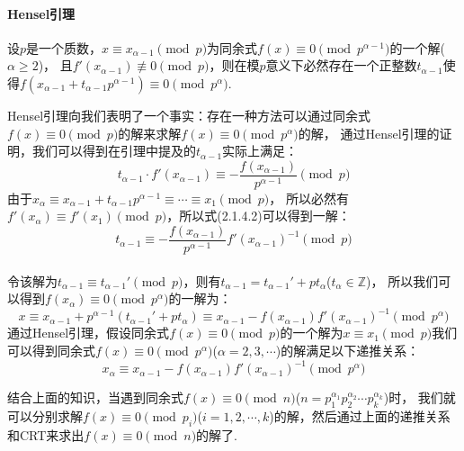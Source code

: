 \documentclass{book}
\numberwithin{equation}{subsubsection}
\begin{document}
\paragraph{\textbf{Hensel引理}}
设$p$是一个质数，$x\equiv x_{\alpha-1}\pmod{p}$为同余式$f(x)\equiv 0\pmod{p^{\alpha-1}}$的一个解($\alpha\ge 2$)，
且$f'(x_{\alpha-1})\not\equiv 0\pmod{p}$，则在模$p$意义下必然存在一个正整数$t_{\alpha-1}$使得$f(x_{\alpha-1}+t_{\alpha-1}p^{\alpha-1})\equiv 0\pmod{p^\alpha}$.\par
Hensel引理向我们表明了一个事实：存在一种方法可以通过同余式$f(x)\equiv 0\pmod{p}$的解来求解$f(x)\equiv 0\pmod{p^\alpha}$的解，
通过Hensel引理的证明，我们可以得到在引理中提及的$t_{\alpha-1}$实际上满足：
\begin{equation}
    t_{\alpha-1}\cdot f'(x_{\alpha-1})\equiv -\frac{f(x_{\alpha-1})}{p^{\alpha-1}}\pmod{p}
\end{equation}
由于$x_{\alpha}\equiv x_{\alpha-1} + t_{\alpha-1}p^{\alpha-1}\equiv\cdots\equiv x_1\pmod{p}$，
所以必然有$f'(x_{\alpha})\equiv f'(x_1)\pmod{p}$，所以式(2.1.4.2)可以得到一解：
\begin{equation}
    t_{\alpha-1}\equiv -\frac{f(x_{\alpha-1})}{p^{\alpha-1}}f'(x_{\alpha-1})^{-1}\pmod{p}
    \nonumber
\end{equation}\\
令该解为$t_{\alpha-1}\equiv t_{\alpha-1}' \pmod{p}$，则有$t_{\alpha-1}=t_{\alpha-1}'+pt_{\alpha}$($t_{\alpha}\in\mathbb{Z}$)，
所以我们可以得到$f(x_{\alpha})\equiv 0\pmod{p^\alpha}$的一解为：
\begin{equation}
    x\equiv x_{\alpha-1}+p^{\alpha-1}(t_{\alpha-1}'+pt_{\alpha})\equiv x_{\alpha-1}-f(x_{\alpha-1})f'(x_{\alpha-1})^{-1}\pmod{p^\alpha}
    \nonumber
\end{equation}
通过Hensel引理，假设同余式$f(x)\equiv 0\pmod{p}$的一个解为$x\equiv x_1\pmod{p}$我们可以得到同余式$f(x)\equiv 0\pmod{p^\alpha}$($\alpha=2,3,\cdots$)的解满足以下递推关系：
\begin{equation}
    x_{\alpha} \equiv x_{\alpha-1}-f(x_{\alpha-1})f'(x_{\alpha-1})^{-1}\pmod{p^\alpha}
    \nonumber
\end{equation}\par
结合上面的知识，当遇到同余式$f(x)\equiv 0\pmod{n}$($n=p_1^{\alpha_1}p_2^{\alpha_2}\cdots p_k^{\alpha_k}$)时，
我们就可以分别求解$f(x)\equiv 0\pmod{p_i}$($i=1,2,\cdots,k$)的解，然后通过上面的递推关系和CRT来求出$f(x)\equiv 0\pmod{n}$的解了.\par
\end{document}
